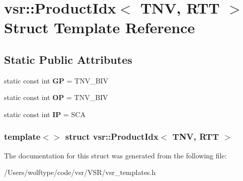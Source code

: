 \hypertarget{structvsr_1_1_product_idx_3_01_t_n_v_00_01_r_t_t_01_4}{\section{vsr\-:\-:Product\-Idx$<$ T\-N\-V, R\-T\-T $>$ Struct Template Reference}
\label{structvsr_1_1_product_idx_3_01_t_n_v_00_01_r_t_t_01_4}
}
\subsection*{Static Public Attributes}
\begin{DoxyCompactItemize}
\item 
\hypertarget{structvsr_1_1_product_idx_3_01_t_n_v_00_01_r_t_t_01_4_a52d6af45b10b4f14ca6b778985a4cb13}{static const int {\bfseries G\-P} = T\-N\-V\-\_\-\-B\-I\-V}\label{structvsr_1_1_product_idx_3_01_t_n_v_00_01_r_t_t_01_4_a52d6af45b10b4f14ca6b778985a4cb13}

\item 
\hypertarget{structvsr_1_1_product_idx_3_01_t_n_v_00_01_r_t_t_01_4_a5a2f270f100f738485845356e7f5fe76}{static const int {\bfseries O\-P} = T\-N\-V\-\_\-\-B\-I\-V}\label{structvsr_1_1_product_idx_3_01_t_n_v_00_01_r_t_t_01_4_a5a2f270f100f738485845356e7f5fe76}

\item 
\hypertarget{structvsr_1_1_product_idx_3_01_t_n_v_00_01_r_t_t_01_4_afd0b4d9d44bf97513adfbf992ee5f31e}{static const int {\bfseries I\-P} = S\-C\-A}\label{structvsr_1_1_product_idx_3_01_t_n_v_00_01_r_t_t_01_4_afd0b4d9d44bf97513adfbf992ee5f31e}

\end{DoxyCompactItemize}
\subsubsection*{template$<$$>$ struct vsr\-::\-Product\-Idx$<$ T\-N\-V, R\-T\-T $>$}



The documentation for this struct was generated from the following file\-:\begin{DoxyCompactItemize}
\item 
/\-Users/wolftype/code/vsr/\-V\-S\-R/vsr\-\_\-templates.\-h\end{DoxyCompactItemize}
